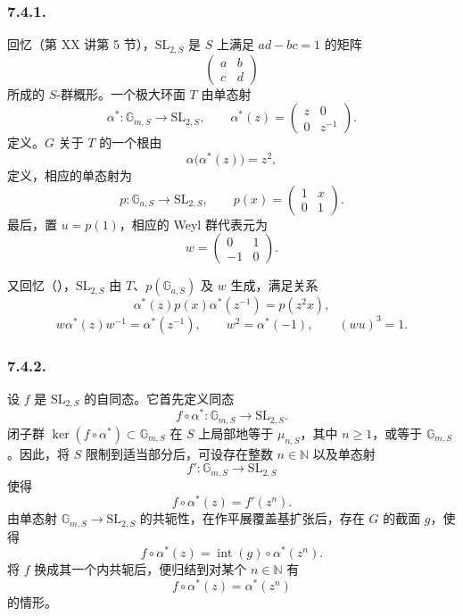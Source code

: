 \subsubsection*{7.4.1.}
回忆（第 XX 讲第 5 节），\(\mathrm{SL}_{2,S}\) 是 \(S\) 上满足 \(ad-bc=1\) 的矩阵
\[
  \begin{pmatrix}a&b\\c&d\end{pmatrix}
\]
所成的 \(S\)-群概形。一个极大环面 \(T\) 由单态射
\[
  \alpha^*:\mathbb G_{m,S}\longrightarrow\mathrm{SL}_{2,S},
  \qquad
  \alpha^*(z)=
  \begin{pmatrix}z&0\\0&z^{-1}\end{pmatrix}.
\]
定义。\(G\) 关于 \(T\) 的一个根由
\[
  \alpha\bigl(\alpha^*(z)\bigr)=z^2,
\]
定义，相应的单态射为
\[
  p:\mathbb G_{a,S}\longrightarrow\mathrm{SL}_{2,S},
  \qquad
  p(x)=
  \begin{pmatrix}1&x\\0&1\end{pmatrix}.
\]
最后，置 \(u=p(1)\)，相应的 Weyl 群代表元为
\[
  w=
  \begin{pmatrix}0&1\\-1&0\end{pmatrix}.
\]

又回忆（），\(\mathrm{SL}_{2,S}\) 由 \(T\)、\(p(\mathbb G_{a,S})\) 及 \(w\) 生成，满足关系
\[
  \alpha^*(z)p(x)\alpha^*(z^{-1})=p(z^2x),
\]
\[
  w\alpha^*(z)w^{-1}=\alpha^*(z^{-1}),
  \qquad
  w^2=\alpha^*(-1),
  \qquad
  (wu)^3=1.
\]

\subsubsection*{7.4.2.}
设 \(f\) 是 \(\mathrm{SL}_{2,S}\) 的自同态。它首先定义同态
\[
  f\circ\alpha^*:\mathbb G_{m,S}\longrightarrow\mathrm{SL}_{2,S}.
\]
闭子群 \(\ker(f\circ\alpha^*)\subset\mathbb G_{m,S}\) 在 \(S\) 上局部地等于 \(\mu_{n,S}\)，其中 \(n\geq1\)，或等于 \(\mathbb G_{m,S}\)。因此，将 \(S\) 限制到适当部分后，可设存在整数 \(n\in\mathbb N\) 以及单态射
\[
  f':\mathbb G_{m,S}\longrightarrow\mathrm{SL}_{2,S}
\]
使得
\[
  f\circ\alpha^*(z)=f'(z^n).
\]
由单态射 \(\mathbb G_{m,S}\to\mathrm{SL}_{2,S}\) 的共轭性，在作平展覆盖基扩张后，存在 \(G\) 的截面 \(g\)，使得
\[
  f\circ\alpha^*(z)
  =
  \operatorname{int}(g)\circ\alpha^*(z^n).
\]
将 \(f\) 换成其一个内共轭后，便归结到对某个 \(n\in\mathbb N\) 有
\[
  f\circ\alpha^*(z)=\alpha^*(z^n)
\]
的情形。

